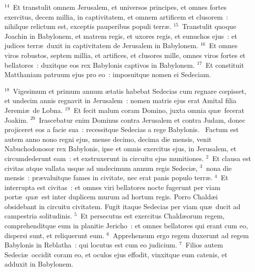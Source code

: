 ${}^{14}$~Et transtulit omnem Jerusalem, et universos principes, et omnes fortes exercitus, decem millia, in captivitatem, et omnem artificem et clusorem~: nihilque relictum est, exceptis pauperibus populi terr\ae .
${}^{15}$~Transtulit quoque Joachin in Babylonem, et matrem regis, et uxores regis, et eunuchos ejus~: et judices terr\ae\ duxit in captivitatem de Jerusalem in Babylonem.
${}^{16}$~Et omnes viros robustos, septem millia, et artifices, et clusores mille, omnes viros fortes et bellatores~: duxitque eos rex Babylonis captivos in Babylonem.
${}^{17}$~Et constituit Matthaniam patruum ejus pro eo~: imposuitque nomen ei Sedeciam.


${}^{18}$~Vigesimum et primum annum \ae tatis habebat Sedecias cum regnare cœpisset, et undecim annis regnavit in Jerusalem~: nomen matris ejus erat Amital filia Jeremi\ae\ de Lobna.
${}^{19}$~Et fecit malum coram Domino, juxta omnia qu\ae\ fecerat Joakim.
${}^{20}$~Irascebatur enim Dominus contra Jerusalem et contra Judam, donec projiceret eos a facie sua~: recessitque Sedecias a rege Babylonis.
~Factum est autem anno nono regni ejus, mense decimo, decima die mensis, venit Nabuchodonosor rex Babylonis, ipse et omnis exercitus ejus, in Jerusalem, et circumdederunt eam~: et exstruxerunt in circuitu ejus munitiones.
${}^{2}$~Et clausa est civitas atque vallata usque ad undecimum annum regis Sedeci\ae ,
${}^{3}$~nona die mensis~: pr\ae valuitque fames in civitate, nec erat panis populo terr\ae .
${}^{4}$~Et interrupta est civitas~: et omnes viri bellatores nocte fugerunt per viam port\ae\ qu\ae\ est inter duplicem murum ad hortum regis. Porro Chald\ae i obsidebant in circuitu civitatem. Fugit itaque Sedecias per viam qu\ae\ ducit ad campestria solitudinis.
${}^{5}$~Et persecutus est exercitus Chald\ae orum regem, comprehenditque eum in planitie Jericho~: et omnes bellatores qui erant cum eo, dispersi sunt, et reliquerunt eum.
${}^{6}$~Apprehensum ergo regem duxerunt ad regem Babylonis in Reblatha~: qui locutus est cum eo judicium.
${}^{7}$~Filios autem Sedeci\ae\ occidit coram eo, et oculos ejus effodit, vinxitque eum catenis, et adduxit in Babylonem.


